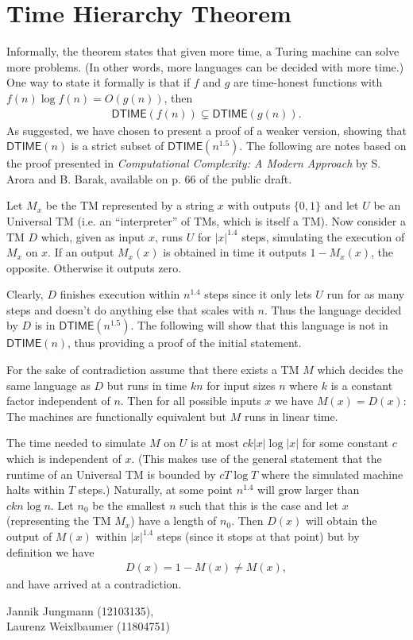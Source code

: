 \documentclass{article}
\begin{document}
\section*{Time Hierarchy Theorem}

Informally, the theorem states that given more time, a Turing machine can solve more problems. (In other words, more languages can be decided with more time.) One way to state it formally is that if $f$ and $g$ are time-honest functions with $f(n) \log f(n) = O(g(n))$, then
\begin{align*}
    \mathsf{DTIME}(f(n)) \subsetneq \mathsf{DTIME}\left(g(n)\right).
\end{align*}
As suggested, we have chosen to present a proof of a weaker version, showing that $\mathsf{DTIME}(n)$ is a strict subset of $\mathsf{DTIME}(n^{1.5})$. The following are notes based on the proof presented in \emph{Computational Complexity: A Modern Approach} by S. Arora and B. Barak, available on p. 66 of the public draft.

Let $M_x$ be the TM represented by a string $x$ with outputs $\{0, 1\}$ and let $U$ be an Universal TM (i.e. an \enquote{interpreter} of TMs, which is itself a TM). Now consider a TM $D$ which, given as input $x$, runs $U$ for $|x|^{1.4}$ steps, simulating the execution of $M_x$ on $x$. If an output $M_x(x)$ is obtained in time it outputs $1 - M_x(x)$, the opposite. Otherwise it outputs zero.

Clearly, $D$ finishes execution within $n^{1.4}$ steps since it only lets $U$ run for as many steps and doesn't do anything else that scales with $n$. Thus the language decided by $D$ is in $\mathsf{DTIME}(n^{1.5})$. The following will show that this language is not in $\mathsf{DTIME}(n)$, thus providing a proof of the initial statement.

For the sake of contradiction assume that there exists a TM $M$ which decides the same language as $D$ but runs in time $kn$ for input sizes $n$ where $k$ is a constant factor independent of $n$. Then for all possible inputs $x$ we have $M(x) = D(x)$: The machines are functionally equivalent but $M$ runs in linear time.

The time needed to simulate $M$ on $U$ is at most $ck|x|\log|x|$ for some constant $c$ which is independent of $x$. (This makes use of the general statement that the runtime of an Universal TM is bounded by $cT \log T$ where the simulated machine halts within $T$ steps.) Naturally, at some point $n^{1.4}$ will grow larger than $ckn \log n$. Let $n_0$ be the smallest $n$ such that this is the case and let $x$ (representing the TM $M_x$) have a length of $n_0$. Then $D(x)$ will obtain the output of $M(x)$ within $|x|^{1.4}$ steps (since it stops at that point) but by definition we have
\begin{align*}
    D(x) = 1 - M(x) \neq M(x),
\end{align*}
and have arrived at a contradiction.

\vspace{0.5cm}

Jannik Jungmann (12103135),\\
Laurenz Weixlbaumer (11804751)
\end{document}

